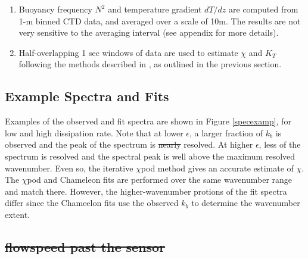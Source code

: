 \documentclass{ametsoc}
\providecommand{\DIFadd}[1]{{\protect\color{blue}\uwave{#1}}} %
\providecommand{\DIFdel}[1]{{\protect\color{red}\sout{#1}}}                      %
\providecommand{\DIFaddbegin}{} %
\providecommand{\DIFaddend}{} %
\providecommand{\DIFdelbegin}{} %
\providecommand{\DIFdelend}{} %
\begin{document}
\begin{enumerate}
\item Buoyancy frequency $N^2$ and temperature gradient $dT/dz$ are computed from 1-m binned CTD data, and averaged over a scale of 10m. The results are not very sensitive to the averaging interval (see appendix for more details).
\item Half-overlapping 1 sec windows of data are used to estimate $\chi$ and $K_T$ following the methods described in \cite{moumnash09}, as outlined in the previous section.
\end{enumerate}


\subsection{Example Spectra and Fits}

Examples of the observed and fit spectra are shown in Figure \ref{specexamp}, for low and high dissipation rate. Note that at lower $\epsilon$, a larger fraction of $k_b$ is observed and the peak of the spectrum is \DIFdelbegin \DIFdel{nearly }\DIFdelend \DIFaddbegin \DIFadd{almost }\DIFaddend resolved. At higher $\epsilon$, less of the spectrum is resolved and the spectral peak is well above the maximum resolved wavenumber. Even so, the iterative $\chi$pod method gives an accurate estimate of $\chi$. The $\chi$pod and Chameleon fits are performed over the same wavenumber range and match there. However, the higher-wavenumber protions of the fit spectra differ since the Chameelon fits use the observed $k_b$ to determine the wavenumber extent.


\DIFdelbegin \subsection{\DIFdel{flowspeed past the sensor}}
\addtocounter{subsection}{-1}%
\DIFdelend %
\end{document}
